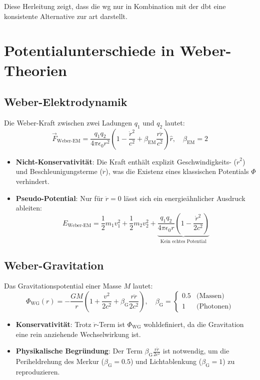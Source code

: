 Diese Herleitung zeigt, dass die \gls{wg} nur in Kombination mit der \gls{dbt} eine konsistente Alternative zur \gls{art} darstellt.

\section{Potentialunterschiede in Weber-Theorien}
\label{sec:weber_potentials}

\subsection{Weber-Elektrodynamik}
Die Weber-Kraft zwischen zwei Ladungen $q_1$ und $q_2$ lautet:
\[
\vec{F}_{\text{Weber-EM}} = \frac{q_1 q_2}{4\pi\epsilon_0 r^2} \left(1 - \frac{\dot{r}^2}{c^2} + \beta_{\text{EM}} \frac{r\ddot{r}}{c^2}\right)\hat{r}, \quad \beta_{\text{EM}} = 2
\]
\begin{itemize}
\item \textbf{Nicht-Konservativität}: Die Kraft enthält explizit Geschwindigkeits- ($\dot{r}^2$) und Beschleunigungsterme ($\ddot{r}$), was die Existenz eines klassischen Potentials $\Phi$ verhindert.
\item \textbf{Pseudo-Potential}: Nur für $\ddot{r} = 0$ lässt sich ein energieähnlicher Ausdruck ableiten:
\[
E_{\text{Weber-EM}} = \frac{1}{2}m_1v_1^2 + \frac{1}{2}m_2v_2^2 + \underbrace{\frac{q_1 q_2}{4\pi\epsilon_0 r}\left(1 - \frac{\dot{r}^2}{2c^2}\right)}_{\text{Kein echtes Potential}}
\]
\end{itemize}

\subsection{Weber-Gravitation}
Das Gravitationspotential einer Masse $M$ lautet:
\[
\Phi_{\text{WG}}(r) = -\frac{GM}{r}\left(1 + \frac{v^2}{2c^2} + \beta_{\text{G}} \frac{r\ddot{r}}{2c^2}\right), \quad \beta_{\text{G}} = 
\begin{cases}
0.5 & \text{(Massen)} \\
1 & \text{(Photonen)}
\end{cases}
\]
\begin{itemize}
\item \textbf{Konservativität}: Trotz $\ddot{r}$-Term ist $\Phi_{\text{WG}}$ wohldefiniert, da die Gravitation eine rein anziehende Wechselwirkung ist.
\item \textbf{Physikalische Begründung}: Der Term $\beta_{\text{G}}\frac{r\ddot{r}}{2c^2}$ ist notwendig, um die Periheldrehung des Merkur ($\beta_{\text{G}} = 0.5$) und Lichtablenkung ($\beta_{\text{G}} = 1$) zu reproduzieren.
\end{itemize}

